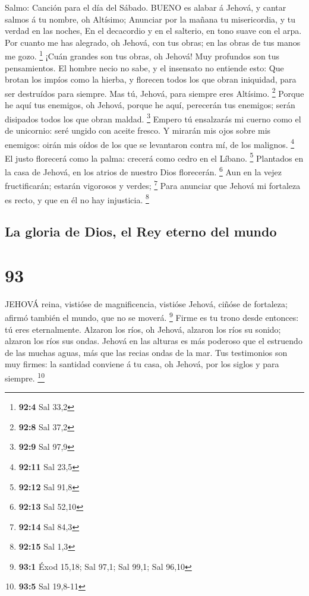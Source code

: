  Salmo: Canción para el día del Sábado. BUENO es alabar á
Jehová, y cantar salmos á tu nombre, oh Altísimo;  Anunciar
por la mañana tu misericordia, y tu verdad en las noches, 
En el decacordio y en el salterio, en tono suave con el arpa.
 Por cuanto me has alegrado, oh Jehová, con tus obras; en
las obras de tus manos me gozo. \footnote{\textbf{92:4} Sal 33,2}
 ¡Cuán grandes son tus obras, oh Jehová! Muy profundos son
tus pensamientos.  El hombre necio no sabe, y el insensato
no entiende esto:  Que brotan los impíos como la hierba, y
florecen todos los que obran iniquidad, para ser destruídos para
siempre.  Mas tú, Jehová, para siempre eres Altísimo.
\footnote{\textbf{92:8} Sal 37,2}  Porque he aquí tus
enemigos, oh Jehová, porque he aquí, perecerán tus enemigos; serán
disipados todos los que obran maldad. \footnote{\textbf{92:9} Sal 97,9}
 Empero tú ensalzarás mi cuerno como el de unicornio: seré
ungido con aceite fresco.  Y mirarán mis ojos sobre mis
enemigos: oirán mis oídos de los que se levantaron contra mí, de los
malignos. \footnote{\textbf{92:11} Sal 23,5}  El justo
florecerá como la palma: crecerá como cedro en el Líbano. \footnote{\textbf{92:12}
  Sal 91,8}  Plantados en la casa de Jehová, en los atrios
de nuestro Dios florecerán. \footnote{\textbf{92:13} Sal 52,10}
 Aun en la vejez fructificarán; estarán vigorosos y verdes;
\footnote{\textbf{92:14} Sal 84,3}  Para anunciar que
Jehová mi fortaleza es recto, y que en él no hay injusticia. \footnote{\textbf{92:15}
  Sal 1,3}

\hypertarget{la-gloria-de-dios-el-rey-eterno-del-mundo}{%
\subsection{La gloria de Dios, el Rey eterno del
mundo}\label{la-gloria-de-dios-el-rey-eterno-del-mundo}}

\hypertarget{section-92}{%
\section{93}\label{section-92}}

 JEHOVÁ reina, vistióse de magnificencia, vistióse Jehová,
ciñóse de fortaleza; afirmó también el mundo, que no se moverá.
\footnote{\textbf{93:1} Éxod 15,18; Sal 97,1; Sal 99,1; Sal 96,10}
 Firme es tu trono desde entonces: tú eres eternalmente.
 Alzaron los ríos, oh Jehová, alzaron los ríos su sonido;
alzaron los ríos sus ondas.  Jehová en las alturas es más
poderoso que el estruendo de las muchas aguas, más que las recias ondas
de la mar.  Tus testimonios son muy firmes: la santidad
conviene á tu casa, oh Jehová, por los siglos y para siempre.
\footnote{\textbf{93:5} Sal 19,8-11}

